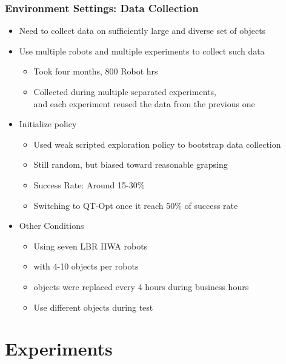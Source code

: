 \documentclass{beamer}
\newcommand{\fifthSec}{Environment Settings}
\newcommand{\sixthSec}{Experiments}
\begin{document}
    \begin{frame}
      \frametitle{\fifthSec : Data Collection}
      \begin{itemize}
        \item Need to collect data on sufficiently large and diverse set of objects
        \item Use multiple robots and multiple experiments to collect such data
        \begin{itemize}
          \item Took four months, 800 Robot hrs
          \item Collected during multiple separated experiments, \\
                and each experiment reused the data from the previous one
          \linebreak
        \end{itemize}
        \pause
        \item Initialize policy
        \begin{itemize}
          \item Used weak scripted exploration policy to bootstrap data collection
          \item Still random, but biased toward reasonable grapsing
          \item Success Rate: Around 15-30\%
          \item Switching to QT-Opt once it reach 50\% of success rate
          \linebreak
        \end{itemize}
        \pause
        \item Other Conditions
        \begin{itemize}
          \item Using seven LBR IIWA robots
          \item with 4-10 objects per robots
          \item objects were replaced every 4 hours during business hours
          \item Use different objects during test
        \end{itemize}
      \end{itemize}
    \end{frame}


  \section{\sixthSec}
\end{document}

